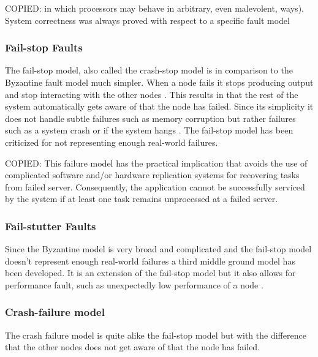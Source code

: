 \documentclass{cslthse-msc}
\begin{document}
COPIED: in which processors may behave in arbitrary, even malevolent, ways). System correctness was always proved with respect to a specific fault model \cite{faultTolerantFundamentals}

\subsubsection*{Fail-stop Faults}
The fail-stop model, also called the crash-stop model is in comparison to the Byzantine fault model much simpler. When a node fails it stops producing output and stop interacting with the other nodes \cite{faultTolerantFundamentals}. This results in that the rest of the system automatically gets aware of that the node has failed. Since its simplicity it does not handle subtle failures such as memory corruption but rather failures such as a system crash or if the system hangs \cite{surveyFaultParallel}. The fail-stop model has been criticized for not representing enough real-world failures.

COPIED: This failure model has the practical implication that avoids the use of complicated software and/or hardware replication systems for recovering tasks from failed server. Consequently, the application cannot be successfully serviced by the system if at least one task remains unprocessed at a failed server. \cite{perfRelNonMarkovian}

\subsubsection*{Fail-stutter Faults}
Since the Byzantine model is very broad and complicated and the fail-stop model doesn't represent enough real-world failures a third middle ground model has been developed. It is an extension of the fail-stop model but it also allows for performance fault, such as unexpectedly low performance of a node \cite{surveyFaultParallel}. 

\subsubsection*{Crash-failure model}
The crash failure model is quite alike the fail-stop model but with the difference that the other nodes does not get aware of that the node has failed.
\end{document}
